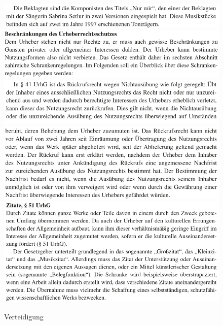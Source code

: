 \documentclass[a4paper, 11pt]{article}
\begin{document}
\begin{figure}
\centering
\includegraphics[width=1\textwidth]{../beklagte0.png}
\includegraphics[width=1\textwidth]{../beschraenkung.png}
\includegraphics[width=1\textwidth]{../rueckrufA.png}
\includegraphics[width=1\textwidth]{../rueckrufB.png}
\includegraphics[width=1\textwidth]{../zitate_51.png}
    \caption{Verteidigung}
\label{img:Verteidigung}
\end{figure}
\end{document}
